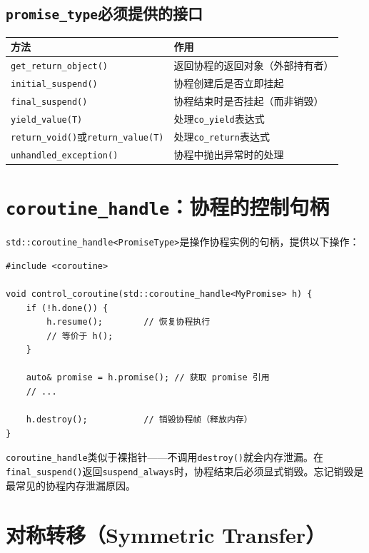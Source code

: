 \documentclass[12pt,a4paper,fontset=fandol]{ctexbook}
\begin{document}
\subsection{\texttt{promise\_type}必须提供的接口}

\begin{longtable}{lp{7cm}}
\toprule
\textbf{方法} & \textbf{作用} \\
\midrule
\texttt{get\_return\_object()} & 返回协程的返回对象（外部持有者） \\
\texttt{initial\_suspend()} & 协程创建后是否立即挂起 \\
\texttt{final\_suspend()} & 协程结束时是否挂起（而非销毁） \\
\texttt{yield\_value(T)} & 处理\texttt{co\_yield}表达式 \\
\texttt{return\_void()}或\texttt{return\_value(T)} & 处理\texttt{co\_return}表达式 \\
\texttt{unhandled\_exception()} & 协程中抛出异常时的处理 \\
\bottomrule
\end{longtable}

\section{\texttt{coroutine\_handle}：协程的控制句柄}

\texttt{std::coroutine\_handle<PromiseType>}是操作协程实例的句柄，提供以下操作：

\begin{lstlisting}
#include <coroutine>

void control_coroutine(std::coroutine_handle<MyPromise> h) {
    if (!h.done()) {
        h.resume();        // 恢复协程执行
        // 等价于 h();
    }

    auto& promise = h.promise(); // 获取 promise 引用
    // ...

    h.destroy();           // 销毁协程帧（释放内存）
}
\end{lstlisting}

\begin{warning}
\texttt{coroutine\_\allowbreak{}handle}类似于裸指针——不调用\texttt{destroy()}就会内存泄漏。在\texttt{final\_\allowbreak{}suspend()}返回\texttt{suspend\_\allowbreak{}always}时，协程结束后必须显式销毁。忘记销毁是最常见的协程内存泄漏原因。
\end{warning}

\section{对称转移（Symmetric Transfer）}
\end{document}

